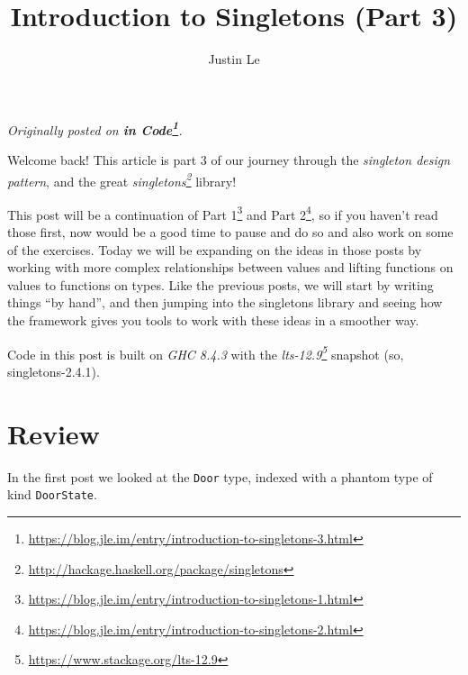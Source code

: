 \documentclass[]{article}
\title{Introduction to Singletons (Part 3)}
\author{Justin Le}
\newenvironment{Shaded}{}{}
\newcommand{\DataTypeTok}[1]{\textcolor[rgb]{0.56,0.13,0.00}{#1}}
\newcommand{\FunctionTok}[1]{\textcolor[rgb]{0.02,0.16,0.49}{#1}}
\newcommand{\KeywordTok}[1]{\textcolor[rgb]{0.00,0.44,0.13}{\textbf{#1}}}
\newcommand{\NormalTok}[1]{#1}
\newcommand{\OtherTok}[1]{\textcolor[rgb]{0.00,0.44,0.13}{#1}}
\renewcommand{\href}[2]{#2\footnote{\url{#1}}}
\begin{document}
\maketitle

\emph{Originally posted on
\textbf{\href{https://blog.jle.im/entry/introduction-to-singletons-3.html}{in
Code}}.}

Welcome back! This article is part 3 of our journey through the \emph{singleton
design pattern}, and the great
\emph{\href{http://hackage.haskell.org/package/singletons}{singletons}} library!

This post will be a continuation of
\href{https://blog.jle.im/entry/introduction-to-singletons-1.html}{Part 1} and
\href{https://blog.jle.im/entry/introduction-to-singletons-2.html}{Part 2}, so
if you haven't read those first, now would be a good time to pause and do so and
also work on some of the exercises. Today we will be expanding on the ideas in
those posts by working with more complex relationships between values and
lifting functions on values to functions on types. Like the previous posts, we
will start by writing things ``by hand'', and then jumping into the singletons
library and seeing how the framework gives you tools to work with these ideas in
a smoother way.

Code in this post is built on \emph{GHC 8.4.3} with the
\emph{\href{https://www.stackage.org/lts-12.9}{lts-12.9}} snapshot (so,
singletons-2.4.1).

\hypertarget{review}{%
\section{Review}\label{review}}

In the first post we looked at the \texttt{Door} type, indexed with a phantom
type of kind \texttt{DoorState}.

\begin{Shaded}
\end{Shaded}
\end{document}
